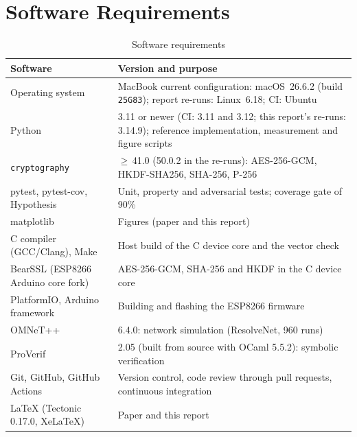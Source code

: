 \section{Software Requirements}
\begin{table}[H]
\centering
\caption{Software requirements}
\label{tab:sw}
\small
\renewcommand{\arraystretch}{1.2}
\begin{tabularx}{\textwidth}{|p{}|X|}
\hline
\textbf{Software} & \textbf{Version and purpose}\\ \hline
Operating system & MacBook current configuration: macOS~26.6.2 (build \texttt{25G83}); report re-runs: Linux~6.18; CI: Ubuntu\\ \hline
Python & 3.11 or newer (CI: 3.11 and 3.12; this report's re-runs: 3.14.9); reference implementation, measurement and figure scripts\\ \hline
\texttt{cryptography} & $\geq$\,41.0 (50.0.2 in the re-runs): AES-256-GCM, HKDF-SHA256, SHA-256, P-256\\ \hline
pytest, pytest-cov, Hypothesis & Unit, property and adversarial tests; coverage gate of 90\%\\ \hline
matplotlib & Figures (paper and this report)\\ \hline
C compiler (GCC/Clang), Make & Host build of the C device core and the vector check\\ \hline
BearSSL (ESP8266 Arduino core fork) & AES-256-GCM, SHA-256 and HKDF in the C device core\\ \hline
PlatformIO, Arduino framework & Building and flashing the ESP8266 firmware\\ \hline
OMNeT++ & 6.4.0: network simulation (ResolveNet, 960 runs)\\ \hline
ProVerif & 2.05 (built from source with OCaml 5.5.2): symbolic verification\\ \hline
Git, GitHub, GitHub Actions & Version control, code review through pull requests, continuous integration\\ \hline
\LaTeX{} (Tectonic 0.17.0, XeLaTeX) & Paper and this report\\ \hline
\end{tabularx}
\end{table}

